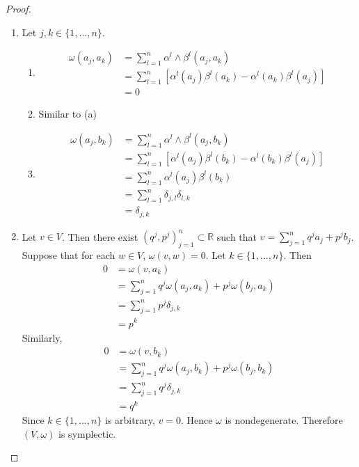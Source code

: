 \documentclass{book}
\theoremstyle{definition}
\newcommand{\al}{\alpha}
\newcommand{\be}{\beta}
\newcommand{\del}{\delta}
\newcommand{\om}{\omega}
\newcommand{\R}{\mathbb{R}}
\DeclareMathOperator*{\0}{\mbf{0}}
\DeclareMathOperator*{\1}{\mbf{1}}
\begin{document}
	\begin{proof}\
		\begin{enumerate}
			\item Let $j,k \in \{1, \ldots, n\}$.
			\begin{enumerate}
				\item \begin{align*}
					\om(a_j, a_k)
					& = \sum_{l=1}^n \al^l \wedge \be^l (a_j, a_k) \\
					& = \sum_{l=1}^n [\al^l(a_j) \be^l (a_k) - \al^l(a_k) \be^l(a_j)] \\
					& = 0 
				\end{align*}
				\item Similar to (a)
				\item 
				\begin{align*}
					\om(a_j, b_k)
					& = \sum_{l=1}^n \al^l \wedge \be^l (a_j, b_k) \\
					& = \sum_{l=1}^n [\al^l(a_j) \be^l (b_k) - \al^l(b_k) \be^l(a_j)] \\
					& = \sum_{l=1}^n \al^l(a_j) \be^l (b_k) \\
					& = \sum_{l=1}^n \del_{j,l} \del_{l,k} \\
					& = \del_{j,k}
				\end{align*}
			\end{enumerate}
			\item Let $v \in V$. Then there exist $(q^j, p^j)_{j=1}^n \subset \R$ such that $v = \sum\limits_{j=1}^n q^j a_j + p^j b_j$. Suppose that for each $w \in V$, $\om(v, w) = 0$. Let $k \in \{1, \ldots, n\}$. Then 
			\begin{align*}
				0
				& = \om(v, a_k) \\
				& = \sum_{j=1}^n q^j \om(a_j, a_k) + p^j \om(b_j, a_k) \\
				& = \sum_{j=1}^n p^j \del_{j,k} \\
				& = p^k
			\end{align*}
			Similarly, 
			\begin{align*}
				0
				& = \om(v, b_k) \\
				& = \sum_{j=1}^n q^j \om(a_j, b_k) + p^j \om(b_j, b_k) \\
				& = \sum_{j=1}^n q^j \del_{j,k} \\
				& = q^k
			\end{align*}
			Since $k \in \{1, \ldots, n\}$ is arbitrary, $v = 0$. Hence $\om$ is nondegenerate. Therefore $(V, \om)$ is symplectic.  
		\end{enumerate}
	\end{proof}
	
\end{document}
